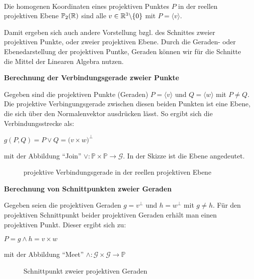   \begin{defi} \ \\
    Die homogenen Koordinaten eines projektiven Punktes $P$ in der reellen projektiven Ebene $\mathbb{P}_2(\mathbb R)$ sind alle
    $v\in \mathbb R^3\backslash\{0\}$ mit $P=\langle v \rangle$.
  \end{defi}

  Damit ergeben sich auch andere Vorstellung bzgl. des Schnittes zweier projektiven Punkte, oder zweier projektiven Ebene.
  Durch die Geraden- oder Ebenedarstellung der projektiven Puntke, Geraden können wir für die Schnitte die Mittel der Linearen
  Algebra nutzen. \par \medskip

  \textbf{Berechnung der Verbindungsgerade zweier Punkte} \par
  Gegeben sind die projektiven Punkte (Geraden) $P=\langle v \rangle$ und $Q=\langle w \rangle$
  mit $P\neq Q$. Die projektive Verbingungsgerade zwischen diesen beiden Punkten ist eine Ebene,
  die sich über den Normalenvektor ausdrücken lässt. So ergibt sich die Verbindungsstrecke als:
  \par
  \begin{center}
    $g(P,Q) = P \vee Q = \big( v \times w \big)^\perp$
  \end{center} \par
  mit der Abbildung "`Join"' $\vee: \mathbb{P} \times \mathbb{P} \rightarrow \mathcal{G}$. In
  der Skizze ist die Ebene angedeutet.
  \begin{figure}[ht]
    
    \caption{projektive Verbindungsgerade in der reellen projektiven Ebene}
  \end{figure}

  \textbf{Berechnung von Schnittpunkten zweier Geraden} \par
  Gegeben seien die projektiven Geraden $g=v^\perp$ und $h=w^\perp$ mit $g\neq h$. Für den
  projektiven Schnittpunkt beider projektiven Geraden erhält man einen projektiven Punkt.
  Dieser ergibt sich zu:
  \begin{center}
    $P = g \wedge h = v \times w $
  \end{center}
  mit der Abbildung "`Meet"' $\wedge: \mathcal{G} \times \mathcal{G} \rightarrow \mathbb{P}$
  \begin{figure}[ht]
    
    \caption{Schnittpunkt zweier projektiven Geraden}
  \end{figure}


